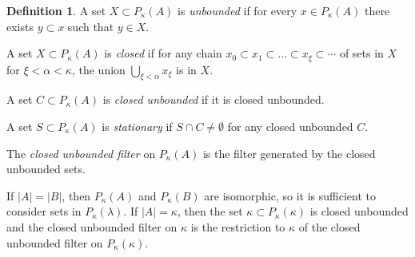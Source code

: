 \documentclass[8pt]{article}
\theoremstyle{definition}
\newtheorem{definition}{Definition}[section]
\theoremstyle{definition}
\theoremstyle{definition}
\theoremstyle{definition}
\theoremstyle{definition}
\theoremstyle{definition}
\theoremstyle{definition}
\theoremstyle{definition}
\theoremstyle{definition}
\theoremstyle{definition}
\theoremstyle{definition}
\theoremstyle{definition}
\theoremstyle{definition}
\theoremstyle{definition}
\theoremstyle{question}
\begin{document}
\begin{definition}
A set $X \subset P_{\kappa}(A)$ is \emph{unbounded} if for every $x \in P_{\kappa}(A)$
there exists $y \subset x$ such that $y \in X$.

A set $X \subset P_{\kappa}(A)$ is \emph{closed} if for any chain 
$x_0 \subset x_1 \subset \ldots \subset x_{\xi} \subset \cdots$ of sets in $X$
for $\xi < \alpha < \kappa$, the union $\bigcup \limits_{\xi < \alpha} x_{\xi}$ is in $X$.

A set $C \subset P_{\kappa}(A)$ is \emph{closed unbounded} if it is closed unbounded.

A set $S \subset P_{\kappa}(A)$ is \emph{stationary} if $S \cap C \neq \emptyset$ for any closed unbounded $C$.

The \emph{closed unbounded filter} on $P_{\kappa}(A)$ is the filter generated by the closed unbounded sets.
\end{definition}

If $|A| = |B|$, then $P_{\kappa}(A)$ and $P_{\kappa}(B)$ are isomorphic, so it is sufficient to consider sets in
$P_{\kappa}(\lambda)$. If $|A| = \kappa$, then the set $\kappa \subset P_{\kappa}(\kappa)$
is closed unbounded and the closed unbounded filter on $\kappa$ is the restriction to $\kappa$
of the closed unbounded filter on $P_{\kappa}(\kappa)$.



\end{document}
